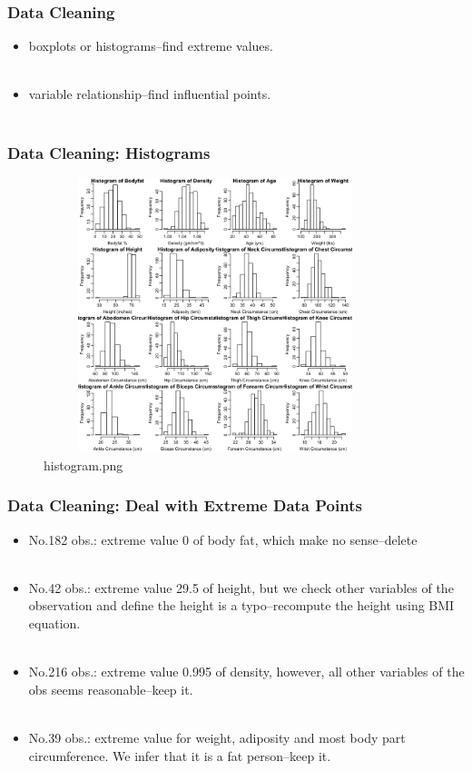 \documentclass{beamer}
\begin{document}
\begin{frame}
\frametitle{Data Cleaning}
\begin{itemize}
\item boxplots or histograms--find extreme values. \\~\\
\item variable relationship--find influential points. \\~\\
\end{itemize}
\end{frame}
\begin{frame}
\frametitle{Data Cleaning: Histograms}
\begin{itemize}
\begin{figure}
\centering
\includegraphics[height=8cm,width=10cm]{histograms.png}
\caption{histogram.png}
\label{2}
\end{figure}
\end{itemize}
\end{frame}

\begin{frame}
\frametitle{Data Cleaning: Deal with Extreme Data Points}
\begin{itemize}
\item No.182 obs.: extreme value 0 of body fat, which make no sense--delete\\~\\ 
\item No.42 obs.: extreme value 29.5 of height, but we check other variables of the observation and define the height is a typo--recompute the height using BMI equation. \\~\\
\item No.216 obs.: extreme value 0.995 of density, however, all other variables of the obs seems reasonable--keep it. \\~\\
\item No.39 obs.: extreme value for weight, adiposity and most body part circumference. We infer that it is a fat person--keep it.
\end{itemize}
\end{frame}
\end{document}
